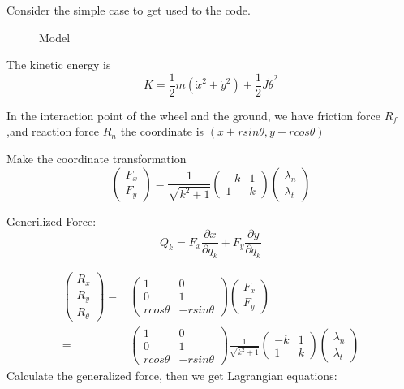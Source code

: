 \documentclass[12 pt]{article}
\begin{document}
Consider the simple case to get used to the code.

\begin{figure}[htbp]
\begin{center}
 
\caption{Model}
\end{center}
\end{figure}


The kinetic energy is 
\begin{equation}
K=\frac{1}{2}m(\dot{x}^2+\dot{y}^2)+\frac{1}{2}J\dot{\theta}^2
\end{equation}


In the interaction point of the wheel and the ground, we have friction force $R_f$,and reaction force $R_n$
the coordinate is $(x+rsin\theta,y+rcos\theta)$

Make the coordinate transformation 
\begin{equation}
\begin{pmatrix}
F_x\\F_y
\end{pmatrix}=
\frac{1}{\sqrt{k^2+1}}\begin{pmatrix}
-k & 1\\
1 & k \end{pmatrix}
\begin{pmatrix}
\lambda_n \\ \lambda_t
\end{pmatrix}
\end{equation}

Generilized Force:
\begin{equation}
Q_k=F_x\frac{\partial x}{\partial q_k} + F_y\frac{\partial y}{\partial q_k}
\end{equation}

\begin{equation}
\begin{aligned}
\begin{pmatrix}
R_x \\ R_y \\R_{\theta}
\end{pmatrix}
=&\begin{pmatrix}
1 & 0 \\
0 & 1 \\
rcos\theta & -rsin\theta
\end{pmatrix}
\begin{pmatrix}
F_x\\F_y
\end{pmatrix}\\
=&\begin{pmatrix}
1 & 0 \\
0 & 1 \\
rcos\theta & -rsin\theta
\end{pmatrix}
\frac{1}{\sqrt{k^2+1}}\begin{pmatrix}
-k & 1\\
1 & k \end{pmatrix}
\begin{pmatrix}
\lambda_n \\ \lambda_t
\end{pmatrix}
\end{aligned}
\end{equation}
Calculate the generalized force, then we get Lagrangian equations:
\end{document}

